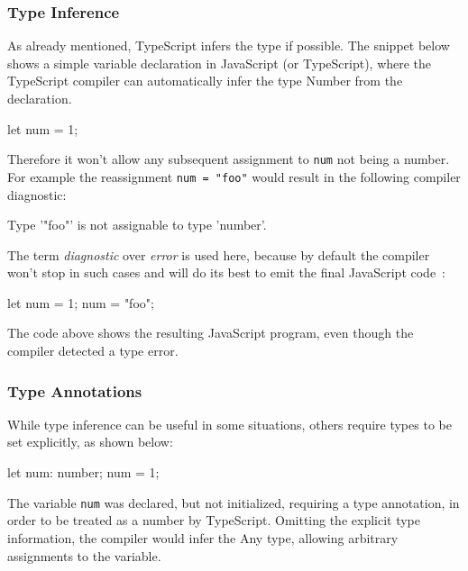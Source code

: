 \subsubsection{Type Inference}
\label{sec:ts-type-inference}

As already mentioned, TypeScript infers the type if possible. The snippet below shows a simple variable declaration in JavaScript (or TypeScript), where the TypeScript compiler can automatically infer the type Number from the declaration.
\begin{JsCode}[numbers=none]
let num = 1;
\end{JsCode}
Therefore it won't allow any subsequent assignment to \texttt{num} not being a number. For example the reassignment \texttt{num = "foo"} would result in the following compiler diagnostic:
\begin{JsCode}[numbers=none]
Type '"foo"' is not assignable to type 'number'.
\end{JsCode}
The term \emph{diagnostic} over \emph{error} is used here, because by default the compiler won't stop in such cases and will do its best to emit the final JavaScript code~\cite[p.~12]{TypeScriptBook:Syed:2017}:
\begin{JsCode}[numbers=none]
let num = 1;
num = "foo";
\end{JsCode}
The code above shows the resulting JavaScript program, even though the compiler detected a type error.

\subsubsection{Type Annotations}
\label{sec:ts-type-annotations}

While type inference can be useful in some situations, others require types to be set explicitly, as shown below:
\begin{JsCode}[numbers=none]
let num: number;
num = 1;
\end{JsCode}
The variable \texttt{num} was declared, but not initialized, requiring  a type annotation, in order to be treated as a number by TypeScript. Omitting the explicit type information, the compiler would infer the Any type, allowing arbitrary assignments to the variable.

%
%

